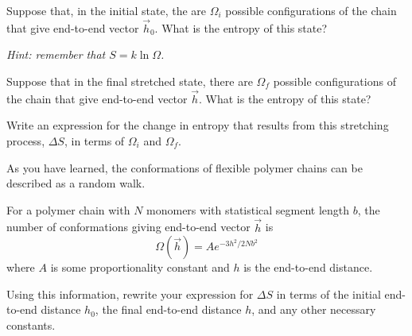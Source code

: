 \begin{activity}
\begin{ctqs}
	\question Suppose that, in the initial state, the are $\Omega_i$ possible configurations of the chain that give end-to-end vector $\vec h_0$.  What is the entropy of this state?
	
		\emph{Hint: remember that $S = k\ln\Omega$.}
		
		\begin{solution}[0.5in]
		\end{solution}
	
	\question Suppose that in the final stretched state, there are $\Omega_f$ possible configurations of the chain that give end-to-end vector $\vec h$.  What is the entropy of this state?
		
		\begin{solution}[0.5in]
		\end{solution}
	
	\question Write an expression for the change in entropy that results from this stretching process, $\Delta S$, in terms of $\Omega_i$ and $\Omega_f$.
		
		\begin{solution}[1in]
		\end{solution}
	
\end{ctqs}

\begin{infobox}

	As you have learned, the conformations of flexible polymer chains can be described as a random walk.
	
	For a polymer chain with $N$ monomers with statistical segment length $b$, the number of conformations giving end-to-end vector $\vec h$ is
	\begin{equation*}
		\Omega(\vec h) = A e^{-3h^2/2Nb^2}
	\end{equation*}
	where $A$ is some proportionality constant and $h$ is the end-to-end distance.
	
\end{infobox}

\begin{ctqs}
	
	\question Using this information, rewrite your expression for $\Delta S$ in terms of the initial end-to-end distance $h_0$, the final end-to-end distance $h$, and any other necessary constants.
	
		\label{\labelbase:forcechain}
		
		\begin{solution}[2in]
		\end{solution}
	

\end{ctqs}
\end{activity}
